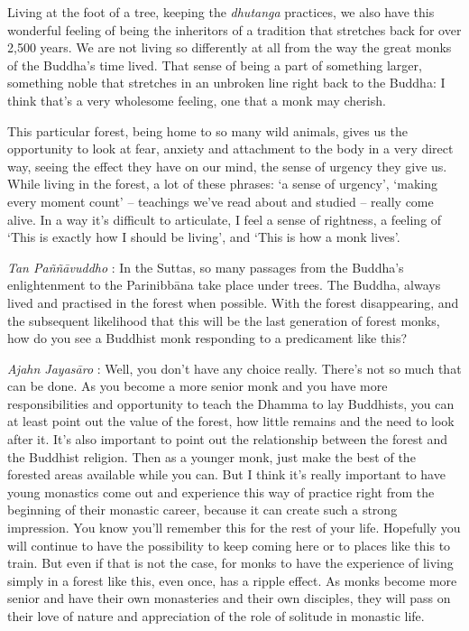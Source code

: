 Living at the foot of a tree, keeping the \emph{dhutanga} practices, we
also have this wonderful feeling of being the inheritors of a tradition
that stretches back for over 2,500 years. We are not living so
differently at all from the way the great monks of the Buddha's time
lived. That sense of being a part of something larger, something noble
that stretches in an unbroken line right back to the Buddha: I think
that's a very wholesome feeling, one that a monk may cherish.

This particular forest, being home to so many wild animals, gives us the
opportunity to look at fear, anxiety and attachment to the body in a
very direct way, seeing the effect they have on our mind, the sense of
urgency they give us. While living in the forest, a lot of these
phrases: `a sense of urgency', `making every moment count' -- teachings
we've read about and studied -- really come alive. In a way it's
difficult to articulate, I feel a sense of rightness, a feeling of `This
is exactly how I should be living', and `This is how a monk lives'.

\emph{Tan Paññāvuddho} : In the Suttas, so many passages from the
Buddha's enlightenment to the Parinibbāna take place under trees. The
Buddha, always lived and practised in the forest when possible. With the
forest disappearing, and the subsequent likelihood that this will be the
last generation of forest monks, how do you see a Buddhist monk
responding to a predicament like this?

\emph{Ajahn Jayasāro }: Well, you don't have any choice really. There's
not so much that can be done. As you become a more senior monk and you
have more responsibilities and opportunity to teach the Dhamma to lay
Buddhists, you can at least point out the value of the forest, how
little remains and the need to look after it. It's also important to
point out the relationship between the forest and the Buddhist religion.
Then as a younger monk, just make the best of the forested areas
available while you can. But I think it's really important to have young
monastics come out and experience this way of practice right from the
beginning of their monastic career, because it can create such a strong
impression. You know you'll remember this for the rest of your life.
Hopefully you will continue to have the possibility to keep coming here
or to places like this to train. But even if that is not the case, for
monks to have the experience of living simply in a forest like this,
even once, has a ripple effect. As monks become more senior and have
their own monasteries and their own disciples, they will pass on their
love of nature and appreciation of the role of solitude in monastic
life.

